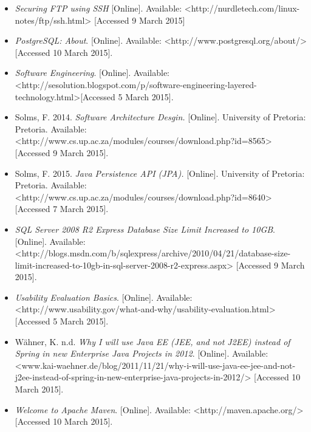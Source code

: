 \documentclass[12pt]{article}
\begin{document}
\begin{itemize}
			\item \textit{Securing FTP using SSH} [Online]. Available: <http://nurdletech.com/linux-notes/ftp/ssh.html> [Accessed 9 March 2015]

			\item \textit{PostgreSQL: About}. [Online]. Available: <http://www.postgresql.org/about/> [Accessed 10 March 2015].
			
			\item \textit{Software Engineering}. [Online]. Available: <http://sesolution.blogspot.com/p/software-engineering-layered-technology.html>[Accessed 5 March 2015].
								
			\item Solms, F. 2014. \textit{Software Architecture Desgin.} [Online]. University of Pretoria: Pretoria. Available: <http://www.cs.up.ac.za/modules/courses/download.php?id=8565> [Accessed 9 March 2015].
			
			\item Solms, F. 2015. \textit{Java Persistence API (JPA).} [Online]. University of Pretoria: Pretoria. Available: <http://www.cs.up.ac.za/modules/courses/download.php?id=8640> [Accessed 7 March 2015].
			
			\item \textit{SQL Server 2008 R2 Express Database Size Limit Increased to 10GB}. [Online]. Available: <http://blogs.msdn.com/b/sqlexpress/archive/2010/04/21/database-size-limit-increased-to-10gb-in-sql-server-2008-r2-express.aspx> [Accessed 9 March 2015].
			
			\item \textit{Usability Evaluation Basics}. [Online]. Available: <http://www.usability.gov/what-and-why/usability-evaluation.html> [Accessed 5 March 2015].

			\item Wähner, K. n.d. \textit{Why I will use Java EE (JEE, and not J2EE) instead of Spring in new Enterprise Java Projects in 2012}. [Online]. Available: <www.kai-waehner.de/blog/2011/11/21/why-i-will-use-java-ee-jee-and-not-j2ee-instead-of-spring-in-new-enterprise-java-projects-in-2012/> [Accessed 10 March 2015].		

			\item \textit{Welcome to Apache Maven}. [Online]. Available: <http://maven.apache.org/> [Accessed 10 March 2015].
			
			

			

		\end{itemize}
\end{document}
